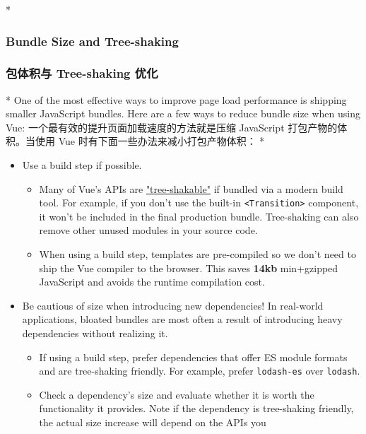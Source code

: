 \begin{paracol}{2} 
\switchcolumn[0]*%
\subsubsection{Bundle Size and Tree-shaking}
\switchcolumn
\subsubsection{包体积与 Tree-shaking 优化}
\switchcolumn[0]*%
One of the most effective ways to improve page load performance is
shipping smaller JavaScript bundles. Here are a few ways to reduce
bundle size when using Vue:
\switchcolumn
一个最有效的提升页面加载速度的方法就是压缩 JavaScript
打包产物的体积。当使用 Vue 时有下面一些办法来减小打包产物体积：
\switchcolumn[0]*%
\begin{itemize}
\item
    Use a build step if possible.
    \begin{itemize}
    \item
    Many of Vue's APIs are
    \href{https://developer.mozilla.org/en-US/docs/Glossary/Tree_shaking}{"tree-shakable"}
    if bundled via a modern build tool. For example, if you don't use
    the built-in \texttt{\textless{}Transition\textgreater{}} component,
    it won't be included in the final production bundle. Tree-shaking
    can also remove other unused modules in your source code.
    \item
    When using a build step, templates are pre-compiled so we don't need
    to ship the Vue compiler to the browser. This saves \textbf{14kb}
    min+gzipped JavaScript and avoids the runtime compilation cost.
    \end{itemize}
\item
    Be cautious of size when introducing new dependencies! In real-world
    applications, bloated bundles are most often a result of introducing
    heavy dependencies without realizing it.
    \begin{itemize}
    \item
    If using a build step, prefer dependencies that offer ES module
    formats and are tree-shaking friendly. For example, prefer
    \texttt{lodash-es} over \texttt{lodash}.
    \item
    Check a dependency's size and evaluate whether it is worth the
    functionality it provides. Note if the dependency is tree-shaking
    friendly, the actual size increase will depend on the APIs you

\end{itemize}
\end{itemize}
\end{paracol}
